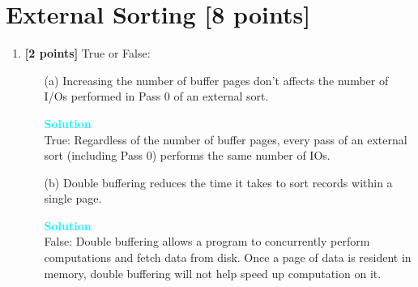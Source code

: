 \documentclass[10pt]{article}
\newenvironment{solution}
    { \begin{mdframed}[backgroundcolor=gray!10] \textcolor{cyan}{\textbf{Solution}} \\}
    {  \end{mdframed}}
\begin{document}
\section{External Sorting \textbf{[8 points]}}
\begin{enumerate}
	\item \textbf{[2 points]} True or False:
	      \begin{itemize}
		      \item[(a)] Increasing the number of buffer pages don't affects the number of I/Os performed in Pass 0 of an external sort.
		            \begin{solution}
			            True: Regardless of the number of buffer pages,
			            every pass of an external sort (including Pass 0) performs the same number of IOs.
		            \end{solution}
		      \item[(b)] Double buffering reduces the time it takes to sort records within a single page.
		            \begin{solution}
			            False: Double buffering allows a program to concurrently perform computations
			            and fetch data from disk. Once a page of data is resident in memory,
			            double buffering will not help speed up computation on it.
		            \end{solution}
	      \end{itemize}


\end{enumerate}
\end{document}
